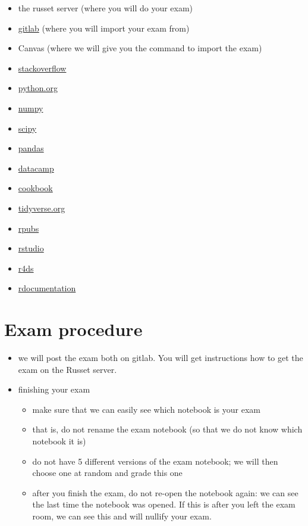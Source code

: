 \documentclass[]{book}
\providecommand{\tightlist}{%
  \setlength{\itemsep}{0pt}\setlength{\parskip}{0pt}}
\begin{document}
\begin{itemize}
\tightlist
\item
  the russet server (where you will do your exam)
\item
  \href{gitlab.uvt.nl}{gitlab} (where you will import your exam from)
\item
  Canvas (where we will give you the command to import the exam)
\item
  \href{https://stackoverflow.com/}{stackoverflow}
\item
  \href{https://www.python.org/}{python.org}
\item
  \href{http://www.numpy.org/}{numpy}
\item
  \href{https://www.scipy.org/}{scipy}
\item
  \href{https://pandas.pydata.org/}{pandas}
\item
  \href{https://www.datacamp.com/home}{datacamp}
\item
  \href{http://www.cookbook-r.com/}{cookbook}
\item
  \href{https://dplyr.tidyverse.org/}{tidyverse.org}
\item
  \href{https://rpubs.com/}{rpubs}
\item
  \href{https://www.rstudio.com/}{rstudio}
\item
  \href{https://r4ds.had.co.nz/}{r4ds}
\item
  \href{https://www.rdocumentation.org/}{rdocumentation}
\end{itemize}

\hypertarget{exam-procedure}{%
\section{Exam procedure}\label{exam-procedure}}

\begin{itemize}
\tightlist
\item
  we will post the exam both on gitlab. You will get instructions how to get the exam on the Russet server.
\item
  finishing your exam

  \begin{itemize}
  \tightlist
  \item
    make sure that we can easily see which notebook is your exam
  \item
    that is, do not rename the exam notebook (so that we do not know which notebook it is)
  \item
    do not have 5 different versions of the exam notebook; we will then choose one at random and grade this one
  \item
    after you finish the exam, do not re-open the notebook again: we can see the last time the notebook was opened. If this is after you left the exam room, we can see this and will nullify your exam.
  \end{itemize}
\end{itemize}


\end{document}
